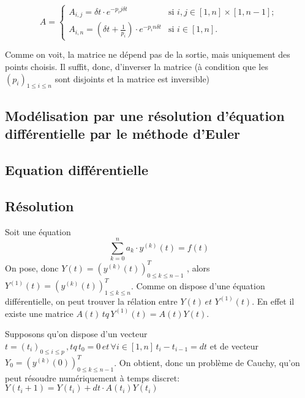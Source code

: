 \documentclass[11pt]{article} %
\begin{document}
\[ A  = \left\{  \begin{array}{ll}
         A_{i,j} = \delta t \cdot e^{-p_i j \delta t} & \mbox{si ${i,j} \in {[1,n] \times [1,n-1]}$}; \\
         A_{i,n} = (\delta t + \frac{1}{p_i}) \cdot e^{-p_i n \delta t}  & \mbox{si $i \in {[1,n]}$}. \end{array} \right. \] 

Comme on voit, la matrice ne dépend pas de la sortie, mais uniquement des points choisis. Il suffit, donc, d'inverser la matrice (à condition que les \begin{math} (p_i)_{1 \leq i \leq n}\end{math} sont disjoints et la matrice est inversible)

\subsection{Modélisation par une résolution d'équation différentielle par le méthode d'Euler} 

\subsection{Equation différentielle}

\subsection{Résolution}

Soit une équation \begin{equation} \sum_{k=0}^{n} a_k \cdot y ^ {(k)}(t) = f(t) \end{equation}
On pose, donc \begin{math} Y(t) = (y^{(k)}(t))_{0 \leq k \leq n-1}^T\end{math} , alors 
\begin{math} Y^{(1)}(t) = (y^{(k)}(t))_{1 \leq k \leq n}^T\end{math}. Comme on dispose d'une équation différentielle, on peut trouver la rélation entre \begin{math} Y(t) \,  et \, \,Y^{(1)}(t) \end{math}. En effet il existe une matrice \begin{math} A(t) \, tq \, Y^{(1)}(t) = A(t)Y(t) \end{math}.

Supposons qu'on dispose d'un vecteur \begin{math} t = (t_i)_{0 \leq i \leq p} \, ,tq \, t_0 = 0  \, et \, \forall i \in [1,n] \, t_i - t_{i-1}= dt \end{math} et de vecteur \begin{math} Y_0 = (y^{(k)}(0))_{0 \leq k \leq n-1}^T \end{math}. On obtient, donc un problème de Cauchy, qu'on peut résoudre numériquement à temps discret:  \begin{math} Y(t_i+1) = Y(t_i) + dt \cdot A(t_i)Y(t_i) \end{math}
\end{document}
